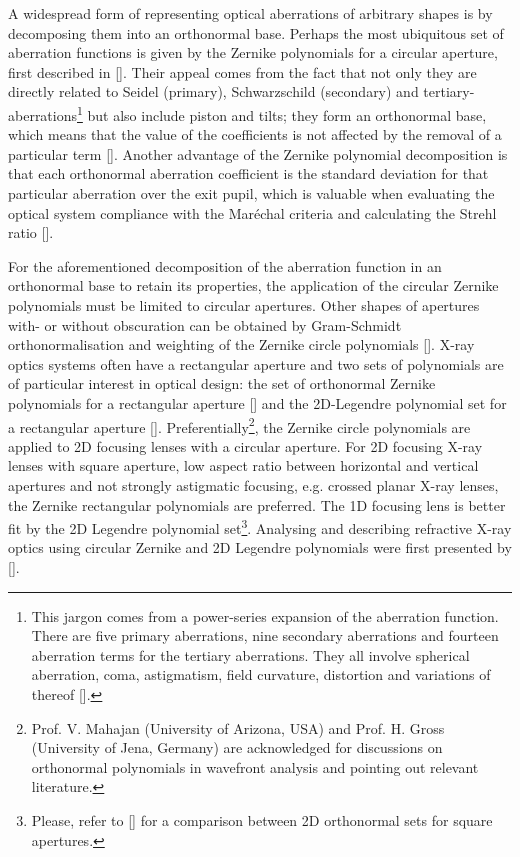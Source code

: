 \begin{refsection}
A widespread form of representing optical aberrations of arbitrary shapes is by decomposing them into an orthonormal base. Perhaps the most ubiquitous set of aberration functions is given by the Zernike polynomials for a circular aperture, first described in [\cite{Zernike1934}]. Their appeal comes from the fact that not only they are directly related to Seidel (primary), Schwarzschild (secondary) and tertiary-aberrations\footnote{This jargon comes from a power-series expansion of the aberration function. There are five primary aberrations, nine secondary aberrations and fourteen aberration terms for the tertiary aberrations. They all involve spherical aberration, coma, astigmatism, field curvature, distortion and variations of thereof [\cite{Mahajan2013}].} but also include piston and tilts; they form an orthonormal base, which means that the value of the coefficients is not affected by the removal of a particular term [\cite{Mahajan2007}]. Another advantage of the Zernike polynomial decomposition is that each orthonormal aberration coefficient is the standard deviation for that particular aberration over the exit pupil, which is valuable when evaluating the optical system compliance with the  Mar\'echal criteria and calculating the Strehl ratio [\cite{Mahajan1983}].

For the aforementioned decomposition of the aberration function in an orthonormal base to retain its properties, the application of the circular Zernike polynomials must be limited to circular apertures. Other shapes of apertures with- or without obscuration can be obtained by Gram-Schmidt orthonormalisation and weighting of the Zernike circle polynomials [\cite{Swantner1994,Mahajan1995}]. X-ray optics systems often have a rectangular aperture and two sets of polynomials are of particular interest in optical design: the set of orthonormal Zernike polynomials for a rectangular aperture  [\cite{Mahajan2007, Mahajan2012}] and the 2D-Legendre polynomial set for a rectangular aperture [\cite{Mahajan2010}]. Preferentially\footnote{Prof. V. Mahajan (University of Arizona, USA) and Prof. H. Gross (University of Jena, Germany) are acknowledged for discussions on orthonormal polynomials in wavefront analysis and pointing out relevant literature.}, the Zernike circle polynomials are applied to 2D focusing lenses with a circular aperture. For 2D focusing X-ray lenses with square aperture, low aspect ratio between horizontal and vertical apertures and not strongly astigmatic focusing, e.g. crossed planar X-ray lenses, the Zernike rectangular polynomials are preferred. The 1D focusing lens is better fit by the 2D Legendre polynomial set\footnote{Please, refer to [\cite{Ye2014}] for a comparison between 2D orthonormal sets for square apertures.}. Analysing and describing refractive X-ray optics using circular Zernike and 2D Legendre polynomials were first presented by [\cite{Koch2016}]. 


\end{refsection}
